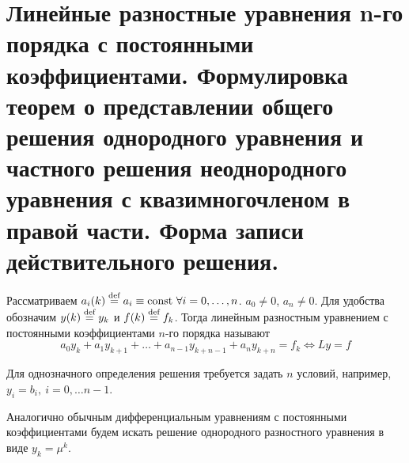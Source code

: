 \section{Линейные разностные уравнения n-го порядка
  с постоянными коэффициентами. Формулировка теорем
  о представлении общего решения однородного уравнения
  и частного решения неоднородного уравнения с квазимногочленом
  в правой части. Форма записи действительного решения.}

\begin{definition}
  Рассматриваем $a_i(k)\stackrel{\text{def}}{=} a_i\equiv\mathrm{const}\ \forall i=0,\ldots,n$. $a_0\neq0$, $a_n\neq0$.
  Для удобства обозначим $y(k)\stackrel{\text{def}}{=} y_k$ и $f(k)\stackrel{\text{def}}{=} f_k$.
  Тогда линейным разностным уравнением с постоянными коэффициентами $n$-го порядка называют
  \[a_0y_k+a_1y_{k+1}+\ldots+a_{n-1}y_{k+n-1}+a_{n}y_{k+n}=f_k\Leftrightarrow Ly=f\]
\end{definition}

Для однозначного определения решения требуется задать
$n$ условий, например, $y_i = b_i,\ i=0,\ldots n-1$.

Аналогично обычным дифференциальным уравнениям с постоянными
коэффициентами будем искать решение однородного
разностного уравнения в виде $y_k = \mu^k$.


